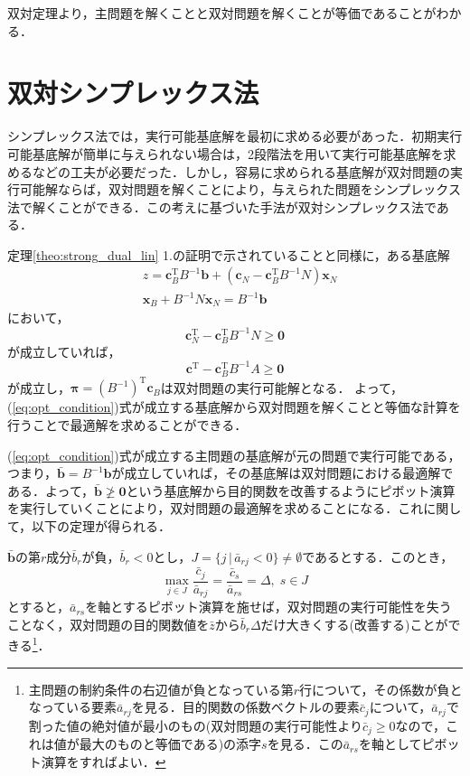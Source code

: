 \documentclass{jsreport}
\begin{document}
双対定理より，主問題を解くことと双対問題を解くことが等価であることがわかる．

\section{双対シンプレックス法}
シンプレックス法では，実行可能基底解を最初に求める必要があった．初期実行可能基底解が簡単に与えられない場合は，2段階法を用いて実行可能基底解を求めるなどの工夫が必要だった．しかし，容易に求められる基底解が双対問題の実行可能解ならば，双対問題を解くことにより，与えられた問題をシンプレックス法で解くことができる．この考えに基づいた手法が双対シンプレックス法である．

定理\ref{theo:strong_dual_lin} 1.の証明で示されていることと同様に，ある基底解
\begin{align}\label{eq:basic_form_rere}
  &z = \bm{c}_B^{\mathrm{T}} B^{-1} \bm{b} + (\bm{c}_N - \bm{c}_B^{\mathrm{T}} B^{-1} N) \bm{x}_N \nonumber \\
  &\bm{x}_B + B^{-1} N \bm{x}_N = B^{-1} \bm{b}
\end{align}
において，
\begin{equation}\label{eq:opt_condition}
  \bm{c}_N^{\mathrm{T}} - \bm{c}_B^{\mathrm{T}} B^{-1} N \geq \bm{0}
\end{equation}
が成立していれば，
\begin{equation}\label{eq:opt_condition_A}
  \bm{c}^{\mathrm{T}} - \bm{c}_B^{\mathrm{T}} B^{-1} A \geq \bm{0}
\end{equation}
が成立し，$\bm{\pi} = (B^{-1})^{\mathrm{T}}\bm{c}_B$は双対問題の実行可能解となる．
よって，(\ref{eq:opt_condition})式が成立する基底解から双対問題を解くことと等価な計算を行うことで最適解を求めることができる．

(\ref{eq:opt_condition})式が成立する主問題の基底解が元の問題で実行可能である，つまり，$\bar{\bm{b}} = B^{-1}\bm{b}$が成立していれば，その基底解は双対問題における最適解である．よって，$\bar{\bm{b}} \ngeq \bm{0}$という基底解から目的関数を改善するようにピボット演算を実行していくことにより，双対問題の最適解を求めることになる．これに関して，以下の定理が得られる．

\begin{theo}\label{theo:dual_improve}
  $\bar{\bm{b}}$の第$r$成分$\bar{b}_r$が負，$\bar{b}_r < 0$とし，$J = \{j \, | \, \bar{a}_{rj} < 0\} \neq \emptyset$であるとする．このとき，
  \begin{equation}\label{eq:maxjdelta}
    \max_{j \in J} \frac{\bar{c}_j}{\bar{a}_{rj}} = \frac{\bar{c}_s}{\bar{a}_{rs}} = \Delta, \; s \in J
  \end{equation}
  とすると，$\bar{a}_{rs}$を軸とするピボット演算を施せば，双対問題の実行可能性を失うことなく，双対問題の目的関数値を$\bar{z}$から$\bar{b}_r \Delta$だけ大きくする(改善する)ことができる\footnote{
  主問題の制約条件の右辺値が負となっている第$r$行について，その係数が負となっている要素$\bar{a}_{rj}$を見る．目的関数の係数ベクトルの要素$\bar{c}_j$について，$\bar{a}_{rj}$で割った値の絶対値が最小のもの(双対問題の実行可能性より$\bar{c}_j \geq 0$なので，これは値が最大のものと等価である)の添字$s$を見る．この$\bar{a}_{rs}$を軸としてピボット演算をすればよい．
  }．
\end{theo}
\end{document}
